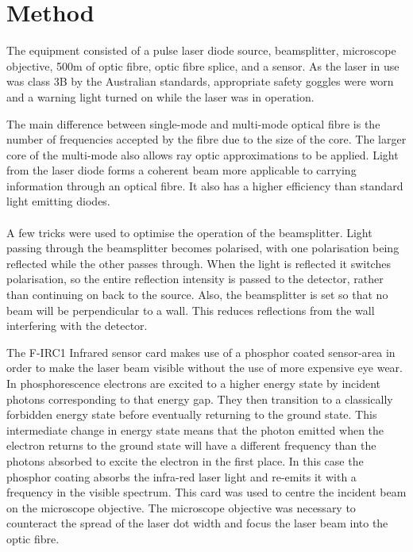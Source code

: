 \section{Method}
The equipment consisted of a pulse laser diode source, beamsplitter, microscope objective,
500m of optic fibre, optic fibre splice, and a sensor.
As the laser in use was class 3B by the Australian standards, appropriate safety goggles were worn and a warning light turned on while the laser was in operation.

The main difference between single-mode and multi-mode optical fibre is the number
of frequencies accepted by the fibre due to the size of the core. The larger core of the multi-mode also allows ray optic approximations to be applied.
Light from the laser diode forms a coherent beam more applicable to carrying information through an optical fibre. It also has a higher efficiency than standard light emitting diodes. \cite{npld}

\paragraph*{}
A few tricks were used to optimise the operation of the beamsplitter.
Light passing through the beamsplitter becomes polarised, with one polarisation being reflected while the other passes through.
When the light is reflected it switches polarisation, so the entire reflection intensity is passed to the detector, rather than continuing on back to the source.
Also, the beamsplitter is set so that no beam will be perpendicular to a wall. This reduces reflections from the wall interfering with the detector.

The F-IRC1 Infrared sensor card makes use of a phosphor coated sensor-area in order to make the laser beam visible without the use of more expensive eye wear. \cite{npsensor}
In phosphorescence electrons are excited to a higher energy state by incident photons corresponding to that energy gap.
They then transition to a classically forbidden energy state before eventually returning to the ground state.
This intermediate change in energy state means that the photon emitted when the electron returns to the ground state
will have a different frequency than the photons absorbed to excite the electron in the first place.
In this case the phosphor coating absorbs the infra-red laser light and re-emits it with a frequency in the visible spectrum. 
This card was used to centre the incident beam on the microscope objective.
The microscope objective was necessary to counteract the spread of the laser dot width and focus the laser beam into the optic fibre. 

